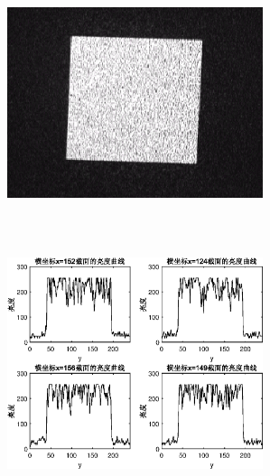 \documentclass[UTF8]{ctexart}
\makeatletter
\newcommand{\figcaption}{\def\@captype{figure}\caption}
\makeatother
\begin{document}
\begin{center}
			\includegraphics[width=7.5cm,height=7.5cm]{YUANaddDOEangel3.eps}
			\includegraphics[width=7.5cm,height=7.5cm]{addDOEangel3.eps}
			\figcaption{加DOE的CCD捕捉图和光亮度曲线(角度3)}\label{addDOEangel3}
			

\end{center}
\end{document}
